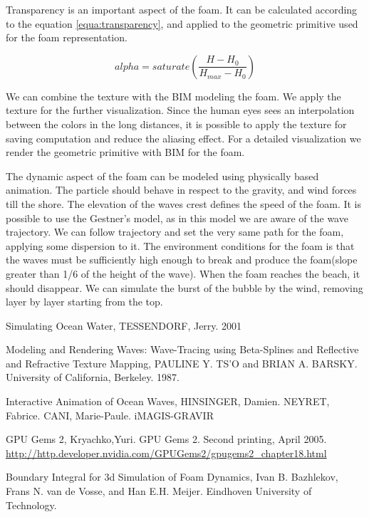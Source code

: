 \documentclass{report}
\begin{document}
Transparency is an important aspect of the foam. It can be calculated\cite{nvidia} according to the equation
\ref{equa:transparency}, and applied to the geometric
primitive used for the foam representation.

\begin{equation} alpha=saturate(\frac{H-H_0}{H_{max} - H_0})
  \label{equa:transparency} \end{equation}

We can combine the texture with the BIM modeling the foam. We apply
the texture for the further visualization. Since the human eyes sees an interpolation
between the colors in the long distances, it is possible to apply the
texture for saving computation and reduce the aliasing effect.  For a
detailed visualization we render the geometric primitive with
BIM for the foam.

The dynamic aspect of the foam can be modeled using physically based animation. The particle should behave in respect to the gravity, and wind forces till the shore. The elevation of the waves crest defines the speed of the foam. It is possible to use the Gestner's model, as in this model we are aware of the wave trajectory. We can follow trajectory and set the very same path for the foam, applying some dispersion to it\cite{iaow}.
The environment conditions for the foam is that the waves must be sufficiently high enough to break and produce the foam(slope greater than 1/6 \cite{sow} of the height of the wave).
When the foam reaches the beach, it should disappear. We can simulate the burst of the bubble by the wind, removing layer by layer starting from the top.


\begin{thebibliography}{9}

    Simulating Ocean Water,
    TESSENDORF, Jerry.
    2001

    Modeling and Rendering Waves: Wave-Tracing using Beta-Splines and Reflective and Refractive Texture Mapping,
    PAULINE Y. TS'O and BRIAN A. BARSKY.
    University of California, Berkeley.
    1987.

    Interactive Animation of Ocean Waves,
    HINSINGER, Damien. NEYRET, Fabrice. CANI, Marie-Paule.
    iMAGIS-GRAVIR

    GPU Gems 2,
    Kryachko,Yuri.
    GPU Gems 2. 
    Second printing, April 2005.
    \url{http://http.developer.nvidia.com/GPUGems2/gpugems2_chapter18.html}

    Boundary Integral for 3d Simulation of Foam Dynamics,
    Ivan B. Bazhlekov, Frans N. van de Vosse, and Han E.H. Meijer.
    Eindhoven University of Technology.

\end{thebibliography}
\end{document}
